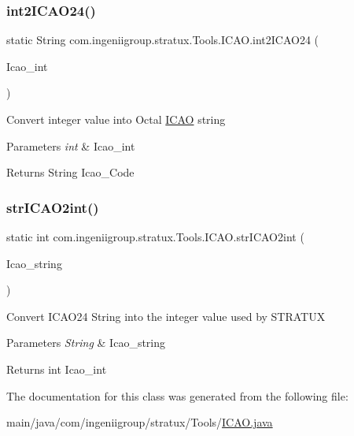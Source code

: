 \subsubsection{\texorpdfstring{int2\+I\+C\+A\+O24()}{int2ICAO24()}}
{\footnotesize\ttfamily static String com.\+ingeniigroup.\+stratux.\+Tools.\+I\+C\+A\+O.\+int2\+I\+C\+A\+O24 (\begin{DoxyParamCaption}\item[{int}]{Icao\+\_\+int }\end{DoxyParamCaption})\hspace{0.3cm}{\ttfamily [static]}}

Convert integer value into Octal \hyperlink{classcom_1_1ingeniigroup_1_1stratux_1_1_tools_1_1_i_c_a_o}{I\+C\+AO} string


\begin{DoxyParams}{Parameters}
{\em int} & Icao\+\_\+int\\
\hline
\end{DoxyParams}
\begin{DoxyReturn}{Returns}
String Icao\+\_\+\+Code 
\end{DoxyReturn}
\mbox{\label{classcom_1_1ingeniigroup_1_1stratux_1_1_tools_1_1_i_c_a_o_a261620737e5ad943494d3d108474e48a}} 
\subsubsection{\texorpdfstring{str\+I\+C\+A\+O2int()}{strICAO2int()}}
{\footnotesize\ttfamily static int com.\+ingeniigroup.\+stratux.\+Tools.\+I\+C\+A\+O.\+str\+I\+C\+A\+O2int (\begin{DoxyParamCaption}\item[{String}]{Icao\+\_\+string }\end{DoxyParamCaption})\hspace{0.3cm}{\ttfamily [static]}}

Convert I\+C\+A\+O24 String into the integer value used by S\+T\+R\+A\+T\+UX


\begin{DoxyParams}{Parameters}
{\em String} & Icao\+\_\+string\\
\hline
\end{DoxyParams}
\begin{DoxyReturn}{Returns}
int Icao\+\_\+int 
\end{DoxyReturn}


The documentation for this class was generated from the following file\+:\begin{DoxyCompactItemize}
\item 
main/java/com/ingeniigroup/stratux/\+Tools/\hyperlink{_i_c_a_o_8java}{I\+C\+A\+O.\+java}\end{DoxyCompactItemize}
